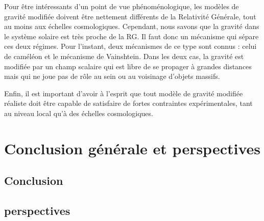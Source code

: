 \documentclass[a4paper,12pt]{report}
\theoremstyle{plain}
\theoremstyle{plain}
\begin{document}
Pour \^etre int\'eressants d'un point de vue ph\'enom\'enologique, les mod\`eles de gravit\'e
modifi\'ee doivent \^etre nettement diff\'erents de la Relativit\'e G\'en\'erale, tout au moins aux
\'echelles cosmologiques. Cependant, nous savons que la gravit\'e dans le syst\`eme solaire est
tr\`es proche de la RG. Il faut donc un m\'ecanisme qui s\'epare ces deux r\'egimes. Pour l'instant,
deux m\'ecanismes de ce type sont connus : celui de cam\'el\'eon et le m\'ecanisme de Vainshtein.
Dans les deux cas, la gravit\'e est modifi\'ee par un champ scalaire qui est libre de se propager
\`a grandes distances mais qui ne joue pas de r\^ole au sein ou au voisinage d'objets massifs.

Enfin, il est important d'avoir \`a l'esprit que tout mod\`ele de gravit\'e modifi\'ee r\'ealiste
doit \^etre capable de satisfaire de fortes contraintes exp\'erimentales, tant au niveau local
qu'\`a des \'echelles cosmologiques. 

\chapter{Conclusion g\'en\'erale et perspectives} \label{chapitre5}
\section{Conclusion}\label{conclusion}
\section{perspectives}\label{perspective}
\end{document}
